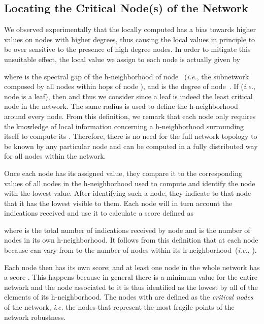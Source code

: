\documentclass[conference,fleqn]{IEEEtran}
\begin{document}
\subsection{Locating the Critical Node(s) of the Network}
\label{subsec:cri}

We observed experimentally that the locally computed  has a bias towards higher values on nodes with higher degrees, 
thus causing the local values in principle to be over sensitive to the presence of high degree nodes.
In order to mitigate this unsuitable effect, the local value  we assign to each node  is actually given by



\noindent
where  is the spectral gap of the h-neighborhood of node~ (\textit{i.e.},
the subnetwork composed by all nodes within  hops of node ),
and  
is the degree of node~. 
If  (\textit{i.e.}, node  is a leaf), then  and thus we consider 
since a leaf is indeed the least critical node in the network.
The same radius is used to define the h-neighborhood around every node.
From this definition, we remark that each node  only requires the knowledge of local information
concerning a \mbox{h-neighborhood} surrounding itself  to compute its .
Therefore, there is no need for the full network
topology to be known by any particular node and  can be computed in a fully distributed way for all
nodes within the network.

Once each node  has its assigned  value, they compare it to the corresponding values of all nodes
in the h-neighborhood used to compute  and identify the node with the lowest  value. After identifying such a node,
they indicate to that node that it has the lowest  visible to them. Each node will in turn account
the indications received and use it to calculate a score  defined as



\noindent
where  is the total number of indications received by node  and  is the number of nodes in its own 
h-neighborhood.
It follows from this definition that  at each node  because  can vary from  to the number
of nodes within its h-neighborhood~(\textit{i.e.}, ).

\long{} 

Each node  then has its own  score; and 
at least one node in the whole network has a score .
This happens because in general there is  a minimum  value for the entire network and the node  associated to it is 
thus identified as the lowest  by all of the
elements of its \mbox{h-neighborhood}. The nodes with  are defined as the \emph{critical nodes} of the network, \textit{i.e.}
the nodes that represent the most fragile points of the network robustness.
\end{document}

